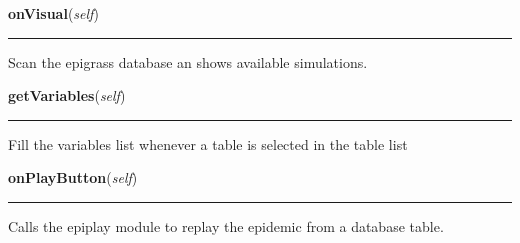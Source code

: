     \label{Epigrass:epigrass:MainPanel_Impl:onVisual}

    \vspace{0.5ex}

    \begin{boxedminipage}{\textwidth}

    \raggedright \textbf{onVisual}(\textit{self})

    \vspace{-1.5ex}

    \rule{\textwidth}{0.5\fboxrule}
    Scan the epigrass database an shows available simulations.

    \vspace{1ex}

    \end{boxedminipage}

    \label{Epigrass:epigrass:MainPanel_Impl:getVariables}

    \vspace{0.5ex}

    \begin{boxedminipage}{\textwidth}

    \raggedright \textbf{getVariables}(\textit{self})

    \vspace{-1.5ex}

    \rule{\textwidth}{0.5\fboxrule}
    Fill the variables list whenever a table is selected in the table list

    \vspace{1ex}

    \end{boxedminipage}

    \label{Epigrass:epigrass:MainPanel_Impl:onPlayButton}

    \vspace{0.5ex}

    \begin{boxedminipage}{\textwidth}

    \raggedright \textbf{onPlayButton}(\textit{self})

    \vspace{-1.5ex}

    \rule{\textwidth}{0.5\fboxrule}
    Calls the epiplay module to replay the epidemic from a database table.

    \vspace{1ex}

    \end{boxedminipage}

